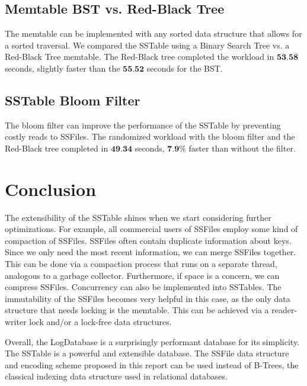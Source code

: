 \documentclass[10pt]{extarticle}
\begin{document}
\subsection{Memtable BST vs. Red-Black Tree}

The memtable can be implemented with any sorted data structure that allows for a sorted traversal. We compared the SSTable using a Binary Search Tree vs. a Red-Black Tree memtable. The Red-Black tree completed the workload in $\textbf{53.58}$ seconds, slightly faster than the $\textbf{55.52}$ seconds for the BST.

\subsection{SSTable Bloom Filter}

The bloom filter can improve the performance of the SSTable by preventing costly reads to SSFiles. The randomized workload with the bloom filter and the Red-Black tree completed in $\textbf{49.34}$ seconds, $\textbf{7.9\%}$ faster than without the filter.

\section{Conclusion}

The extensibility of the SSTable shines when we start considering further optimizations. For example, all commercial users of SSFiles employ some kind of compaction of SSFiles. SSFiles often contain duplicate information about keys. Since we only need the most recent information, we can merge SSFiles together. This can be done via a compaction process that runs on a separate thread, analogous to a garbage collector. Furthermore, if space is a concern, we can compress SSFiles. Concurrency can also be implemented into SSTables. The immutability of the SSFiles becomes very helpful in this case, as the only data structure that needs locking is the memtable. This can be achieved via a reader-writer lock and/or a lock-free data structures.

Overall, the LogDatabase is a surprisingly performant database for its simplicity. The SSTable is a powerful and extensible database. The SSFile data structure and encoding scheme proposed in this report can be used instead of B-Trees, the classical indexing data structure used in relational databases.

\newpage 
\printbibliography
\end{document}
